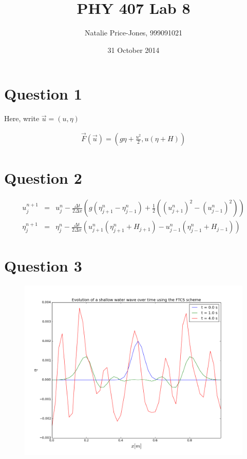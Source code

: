 \documentclass[a4paper,12pt]{article}
\begin{document}
\onehalfspacing
\title{PHY 407 Lab 8}
\author{Natalie Price-Jones, 999091021}
\date{31 October 2014}
\maketitle

\section{Question 1}

Here, write $\vec{u} = (u,\eta)$

\begin{eqnarray}
\vec{F}(\vec{u}) = \left(g\eta + \frac{u^2}{2}, u(\eta + H)\right)
\label{eqn:vecF}
\end{eqnarray}

\section{Question 2}

\begin{eqnarray}
u_{j}^{n+1} &=& u_j^n - \frac{\Delta t}{2\Delta x}\left(g(\eta_{j+1}^n - \eta_{j-1}^n) + \frac{1}{2}((u_{j+1}^n)^2 - (u_{j-1}^n)^2)\right)\nonumber\\
\eta_{j}^{n+1} &=& \eta_j^n - \frac{\Delta t}{2\Delta x}\left(u_{j+1}^n(\eta_{j+1}^n + H_{j+1}) - u_{j-1}^n(\eta_{j-1}^n + H_{j-1})\right)\nonumber
\end{eqnarray}

\section{Question 3}

\begin{figure}[H]
\centering
\includegraphics[width = \linewidth]{lab8q3.png}
\caption{}
\label{fig:q3}
\end{figure}
\end{document}
